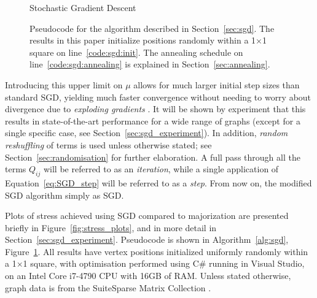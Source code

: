 \begin{figure}
\begin{algorithm}[H]
{{        
      }
    }
    \caption{Stochastic Gradient Descent}
    \label{alg:sgd}
  \end{algorithm}

  \caption[Pseudocode for stochastic gradient descent]{
  Pseudocode for the algorithm described in Section~\ref{sec:sgd}.
  The results in this paper initialize positions randomly within a 1$\times$1 square on line~\ref{code:sgd:init}.
  The annealing schedule on line~\ref{code:sgd:annealing} is explained in Section~\ref{sec:annealing}.
  }
  \label{fig:pseudo_sgd}
\end{figure}

Introducing this upper limit on $\mu$ allows for much larger initial step sizes than standard SGD, yielding much faster convergence without needing to worry about divergence due to \emph{exploding gradients} \citep{Goodfellow2016}. It will be shown     by experiment that this results in state-of-the-art performance for a wide range of graphs (except for a single specific case, see Section~\ref{sec:sgd_experiment}).
In addition, \emph{random reshuffling} of terms is used unless otherwise stated; see Section~\ref{sec:randomisation} for further elaboration. A full pass through all the terms $Q_{ij}$ will be referred to as an \emph{iteration}, while a single application of Equation~\eqref{eq:SGD_step} will be referred to as a \emph{step}.
From now on, the modified SGD algorithm simply as SGD.

Plots of stress achieved using SGD compared to majorization are presented briefly in Figure~\ref{fig:stress_plots}, and in more detail in Section~\ref{sec:sgd_experiment}. Pseudocode is shown in Algorithm~\ref{alg:sgd}, Figure~\ref{fig:pseudo_sgd}.
All results have vertex positions initialized uniformly randomly within a 1$\times$1 square, with optimisation performed using C\# running in Visual Studio, on an Intel Core i7-4790 CPU with 16GB of RAM.
Unless stated otherwise, graph data is from the SuiteSparse Matrix Collection \citep{Davis2011}.

